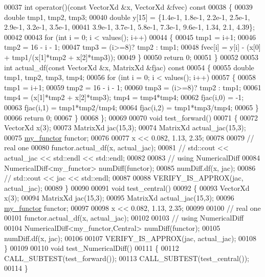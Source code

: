\begin{DoxyCode}
00037     \textcolor{keywordtype}{int} operator()(\textcolor{keyword}{const} VectorXd &x, VectorXd &fvec)\textcolor{keyword}{ const}
00038 \textcolor{keyword}{    }\{
00039         \textcolor{keywordtype}{double} tmp1, tmp2, tmp3;
00040         \textcolor{keywordtype}{double} y[15] = \{1.4e-1, 1.8e-1, 2.2e-1, 2.5e-1, 2.9e-1, 3.2e-1, 3.5e-1,
00041             3.9e-1, 3.7e-1, 5.8e-1, 7.3e-1, 9.6e-1, 1.34, 2.1, 4.39\};
00042 
00043         \textcolor{keywordflow}{for} (\textcolor{keywordtype}{int} i = 0; i < values(); i++)
00044         \{
00045             tmp1 = i+1;
00046             tmp2 = 16 - i - 1;
00047             tmp3 = (i>=8)? tmp2 : tmp1;
00048             fvec[i] = y[i] - (x[0] + tmp1/(x[1]*tmp2 + x[2]*tmp3));
00049         \}
00050         \textcolor{keywordflow}{return} 0;
00051     \}
00052 
00053     \textcolor{keywordtype}{int} actual\_df(\textcolor{keyword}{const} VectorXd &x, MatrixXd &fjac)\textcolor{keyword}{ const}
00054 \textcolor{keyword}{    }\{
00055         \textcolor{keywordtype}{double} tmp1, tmp2, tmp3, tmp4;
00056         \textcolor{keywordflow}{for} (\textcolor{keywordtype}{int} i = 0; i < values(); i++)
00057         \{
00058             tmp1 = i+1;
00059             tmp2 = 16 - i - 1;
00060             tmp3 = (i>=8)? tmp2 : tmp1;
00061             tmp4 = (x[1]*tmp2 + x[2]*tmp3); tmp4 = tmp4*tmp4;
00062             fjac(i,0) = -1;
00063             fjac(i,1) = tmp1*tmp2/tmp4;
00064             fjac(i,2) = tmp1*tmp3/tmp4;
00065         \}
00066         \textcolor{keywordflow}{return} 0;
00067     \}
00068 \};
00069 
00070 \textcolor{keywordtype}{void} test\_forward()
00071 \{
00072     VectorXd x(3);
00073     MatrixXd jac(15,3);
00074     MatrixXd actual\_jac(15,3);
00075     \hyperlink{structmy__functor}{my\_functor} functor;
00076 
00077     x << 0.082, 1.13, 2.35;
00078 
00079     \textcolor{comment}{// real one }
00080     functor.actual\_df(x, actual\_jac);
00081 \textcolor{comment}{//    std::cout << actual\_jac << std::endl << std::endl;}
00082 
00083     \textcolor{comment}{// using NumericalDiff}
00084     NumericalDiff<my\_functor> numDiff(functor);
00085     numDiff.df(x, jac);
00086 \textcolor{comment}{//    std::cout << jac << std::endl;}
00087 
00088     VERIFY\_IS\_APPROX(jac, actual\_jac);
00089 \}
00090 
00091 \textcolor{keywordtype}{void} test\_central()
00092 \{
00093     VectorXd x(3);
00094     MatrixXd jac(15,3);
00095     MatrixXd actual\_jac(15,3);
00096     \hyperlink{structmy__functor}{my\_functor} functor;
00097 
00098     x << 0.082, 1.13, 2.35;
00099 
00100     \textcolor{comment}{// real one }
00101     functor.actual\_df(x, actual\_jac);
00102 
00103     \textcolor{comment}{// using NumericalDiff}
00104     NumericalDiff<my\_functor,Central> numDiff(functor);
00105     numDiff.df(x, jac);
00106 
00107     VERIFY\_IS\_APPROX(jac, actual\_jac);
00108 \}
00109 
00110 \textcolor{keywordtype}{void} test\_NumericalDiff()
00111 \{
00112     CALL\_SUBTEST(test\_forward());
00113     CALL\_SUBTEST(test\_central());
00114 \}
\end{DoxyCode}
